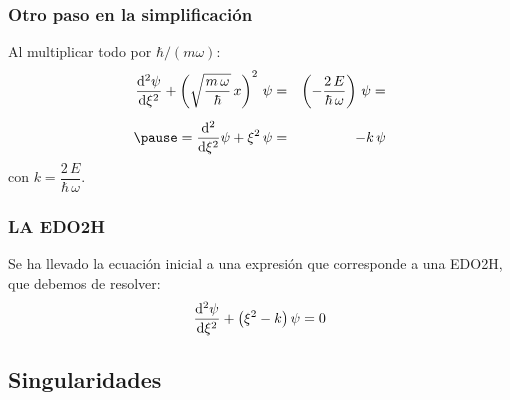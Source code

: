 \documentclass[12pt]{beamer}
\begin{document}
\begin{frame}
\frametitle{Otro paso en la simplificación}
Al multiplicar todo por $\hbar / (m \omega)$:
\pause
\begin{eqnarray*}
\dv[2]{\psi}{\xi} + \left( \sqrt{\dfrac{m \, \omega}{\hbar}} \, x \right)^{2} \, \psi &=& \left( - \dfrac{2 \, E}{\hbar \, \omega} \right) \, \psi = \\[0.5em] \pause
= \dv[2]{\xi} \psi + \xi^{2} \, \psi &=& - k \, \psi
\end{eqnarray*}
\pause
con $k = \dfrac{2 \, E}{\hbar \, \omega}$.
\end{frame}
\begin{frame}
\frametitle{LA EDO2H}
Se ha llevado la ecuación inicial a una expresión que corresponde a una EDO2H, que debemos de resolver:
\pause
\begin{align}
\dv[2]{\psi}{\xi} + \big( \xi^{2} - k \big) \, \psi = 0
\label{eq:ED_oscilador}
\end{align}
\end{frame}

\subsection{Singularidades}
\end{document}

